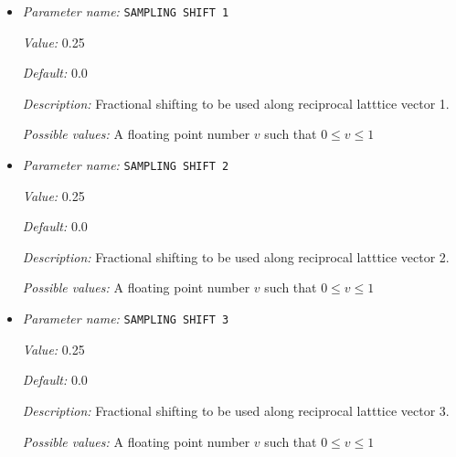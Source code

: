 \begin{itemize}
{\it Possible values:} An integer $n$ such that $1\leq n \leq 100$
\item {\it Parameter name:} {\tt SAMPLING SHIFT 1}
\label{parameters:Brillouin zone k point sampling options/Monkhorst_2dPack _28MP_29 grid generation/SAMPLING SHIFT 1}
\label{parameters:Brillouin_20zone_20k_20point_20sampling_20options/Monkhorst_2dPack_20_28MP_29_20grid_20generation/SAMPLING_20SHIFT_201}


{\it Value:} 0.25


{\it Default:} 0.0


{\it Description:} Fractional shifting to be used along reciprocal latttice vector 1.


{\it Possible values:} A floating point number $v$ such that $0 \leq v \leq 1$
\item {\it Parameter name:} {\tt SAMPLING SHIFT 2}
\label{parameters:Brillouin zone k point sampling options/Monkhorst_2dPack _28MP_29 grid generation/SAMPLING SHIFT 2}
\label{parameters:Brillouin_20zone_20k_20point_20sampling_20options/Monkhorst_2dPack_20_28MP_29_20grid_20generation/SAMPLING_20SHIFT_202}


{\it Value:} 0.25


{\it Default:} 0.0


{\it Description:} Fractional shifting to be used along reciprocal latttice vector 2.


{\it Possible values:} A floating point number $v$ such that $0 \leq v \leq 1$
\item {\it Parameter name:} {\tt SAMPLING SHIFT 3}
\label{parameters:Brillouin zone k point sampling options/Monkhorst_2dPack _28MP_29 grid generation/SAMPLING SHIFT 3}
\label{parameters:Brillouin_20zone_20k_20point_20sampling_20options/Monkhorst_2dPack_20_28MP_29_20grid_20generation/SAMPLING_20SHIFT_203}


{\it Value:} 0.25


{\it Default:} 0.0


{\it Description:} Fractional shifting to be used along reciprocal latttice vector 3.


{\it Possible values:} A floating point number $v$ such that $0 \leq v \leq 1$
\end{itemize}

